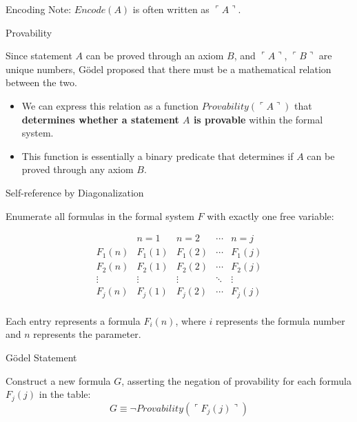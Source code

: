 \documentclass[final]{beamer}
\newlength{\colwidth}
\begin{document}
\begin{frame}[t]
\begin{columns}[t]
\begin{column}{\colwidth}
\begin{block}{Encoding}
    Note: $Encode(A)$ is often written as $\ulcorner \!A \urcorner$.

  \end{block}


 \begin{block}{Provability}

Since statement $A$ can be proved through an axiom $B$, and $\ulcorner \!A \urcorner$, $\ulcorner \!B \urcorner$ are unique numbers, Gödel proposed that there must be a mathematical relation between the two.

 \begin{itemize}
    
    \item We can express this relation as a function $Provability(\ulcorner \!A \urcorner)$ that \textbf{determines whether a statement $A$ is provable} within the formal system.
    
    \item This function is essentially a binary predicate that determines if $A$ can be proved through any axiom $B$.
    
    \end{itemize}

 \end{block}


 \begin{block}{Self-reference by Diagonalization}

    Enumerate all formulas in the formal system $F$ with exactly one free variable:
    
    \[
    \begin{array}{c|c|c|c|c}
    & n=1 & n=2 & \cdots & n = j \\
    \hline
    F_1(n) & F_1(1) & F_1(2) & \cdots & F_1(j) \\
    F_2(n) & F_2(1) & F_2(2) & \cdots & F_2(j) \\
    \vdots & \vdots & \vdots & \ddots & \vdots \\
    F_j(n) & F_j(1) & F_j(2) & \cdots & F_j(j) \\
    \end{array}
    \]


Each entry represents a formula \( F_i(n) \), where \( i \) represents the formula number and \( n \) represents the parameter.
\end{block}


\begin{alertblock}{Gödel Statement}

Construct a new formula $G$, asserting the negation of provability for each formula $F_j(j)$ in the table:
$$G \equiv \neg Provability(\ulcorner F_j(j)\urcorner)$$
 \end{alertblock}


\end{column}
\end{columns}
\end{frame}
\end{document}
